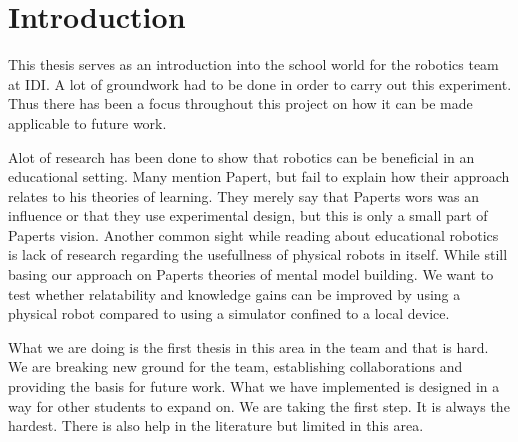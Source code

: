 \chapter{Introduction}
This thesis serves as an introduction into the school world for the robotics team at IDI. A lot of groundwork had to be done in order to carry out this experiment. Thus there has been a focus throughout this project on how it can be made applicable to future work.

\bigskip\noindent
Alot of research has been done to show that robotics can be beneficial in an educational setting. 
Many mention Papert, but fail to explain how their approach relates to his theories of learning.
They merely say that Paperts wors was an influence or that they use experimental design, but this is only a small part of Paperts vision. 
Another common sight while reading about educational robotics is lack of research regarding the usefullness of physical robots in itself. 
While still basing our approach on Paperts theories of mental model building. We want to test whether relatability and knowledge gains can be improved by using a physical robot compared to using a simulator confined to a local device.

\bigskip\noindent
What we are doing is the first thesis in this area in the team and that is hard. We are breaking new ground for the team, establishing collaborations and providing the basis for future work. What we have implemented is designed in a way for other students to expand on. We are taking the first step. It is always the hardest. There is also help in the literature but limited in this area. 





